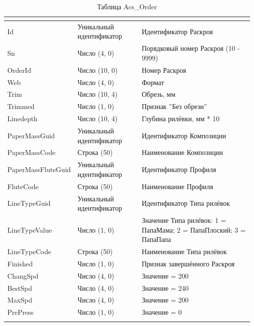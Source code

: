 \scriptsize
\begin{longtable}{|p{56mm}|p{56mm}|p{56mm}|}
\hline
{\bf \parbox[c][5mm]{56mm}{}} & {\bf \parbox[c]{56mm}{}} & {\bf \parbox[c]{56mm}{}} \\
\hline
\parbox[c][5mm]{56mm}{Id} & \parbox{56mm}{Уникальный идентификатор} & \parbox{56mm}{Идентификатор Раскроя} \\
\hline
\parbox[c][5mm]{56mm}{Sn} & \parbox{56mm}{Число (4, 0)} & \parbox{56mm}{Порядковый номер Раскроя (10 - 9999)} \\
\hline
\parbox[c][5mm]{56mm}{OrderId} & \parbox{56mm}{Число (10, 0)} & \parbox{56mm}{Номер Раскроя} \\
\hline
\parbox[c][5mm]{56mm}{Web} & \parbox{56mm}{Число (4, 0)} & \parbox{56mm}{Формат} \\
\hline
\parbox[c][5mm]{56mm}{Trim} & \parbox{56mm}{Число (10, 4)} & \parbox{56mm}{Обрезь, мм} \\
\hline
\parbox[c][5mm]{56mm}{Trimmed} & \parbox{56mm}{Число (1, 0)} & \parbox{56mm}{Признак ''Без обрези''} \\
\hline
\parbox[c][5mm]{56mm}{Linedepth} & \parbox{56mm}{Число (10, 4)} & \parbox{56mm}{Глубина рилёвки, мм * 10} \\
\hline
\parbox[c][5mm]{56mm}{PaperMassGuid} & \parbox{56mm}{Уникальный идентификатор} & \parbox{56mm}{Идентификатор Композиции} \\
\hline
\parbox[c][5mm]{56mm}{PaperMassCode} & \parbox{56mm}{Строка (50)} & \parbox{56mm}{Наименование Композиции} \\
\hline
\parbox[c][5mm]{56mm}{PaperMassFluteGuid} & \parbox{56mm}{Уникальный идентификатор} & \parbox{56mm}{Идентификатор Профиля} \\
\hline
\parbox[c][5mm]{56mm}{FluteCode} & \parbox{56mm}{Строка (50)} & \parbox{56mm}{Наименование Профиля} \\
\hline
\parbox[c][5mm]{56mm}{LineTypeGuid} & \parbox{56mm}{Уникальный идентификатор} & \parbox{56mm}{Идентификатор Типа рилёвок} \\
\hline
\parbox[c][21mm]{56mm}{LineTypeValue} & \parbox{56mm}{Число (1, 0)} & \parbox{56mm}{Значение Типа рилёвок: 1 = ПапаМама; 2 = ПапаПлоский; 3 = ПапаПапа} \\
\hline
\parbox[c][5mm]{56mm}{LineTypeCode} & \parbox{56mm}{Строка (50)} & \parbox{56mm}{Наименование Типа рилёвок} \\
\hline
\parbox[c][5mm]{56mm}{Finished} & \parbox{56mm}{Число (1, 0)} & \parbox{56mm}{Признак завершённого Раскроя} \\
\hline
\parbox[c][5mm]{56mm}{ChangSpd} & \parbox{56mm}{Число (4, 0)} & \parbox{56mm}{Значение = 200} \\
\hline
\parbox[c][5mm]{56mm}{BestSpd} & \parbox{56mm}{Число (4, 0)} & \parbox{56mm}{Значение = 240} \\
\hline
\parbox[c][5mm]{56mm}{MaxSpd} & \parbox{56mm}{Число (4, 0)} & \parbox{56mm}{Значение = 200} \\
\hline
\parbox[c][5mm]{56mm}{PrePress} & \parbox{56mm}{Число (1, 0)} & \parbox{56mm}{Значение = 0} \\
\hline
\caption{Таблица Acs\_Order}\label{tab:Acs_Order}
\end{longtable}  
